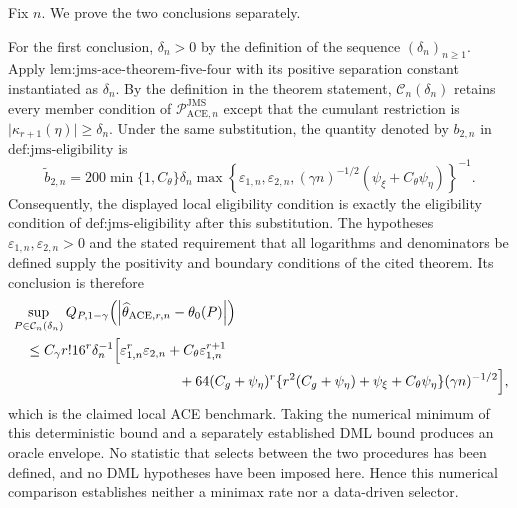 Fix \(n\).  We prove the two conclusions separately.

For the first conclusion, \(\delta_n>0\) by the definition of the sequence \((\delta_n)_{n\geq 1}\).  Apply \(\text{lem:jms-ace-theorem-five-four}\) with its positive separation constant instantiated as \(\delta_n\).  By the definition in the theorem statement, \(\mathcal C_n(\delta_n)\) retains every member condition of \(\mathcal P_{\mathrm{ACE},n}^{\mathrm{JMS}}\) except that the cumulant restriction is \(\lvert\kappa_{r+1}(\eta)\rvert\geq\delta_n\).  Under the same substitution, the quantity denoted by \(b_{2,n}\) in \(\text{def:jms-eligibility}\) is
\[
 \widetilde b_{2,n}
 =200\min\{1,C_{\theta}\}\delta_n
 \max\!\left\{
   \varepsilon_{1,n},\varepsilon_{2,n},
   (\gamma n)^{-1/2}(\psi_{\xi}+C_{\theta}\psi_{\eta})
 \right\}^{-1}.
\]
Consequently, the displayed local eligibility condition is exactly the eligibility condition of \(\text{def:jms-eligibility}\) after this substitution.  The hypotheses \(\varepsilon_{1,n},\varepsilon_{2,n}>0\) and the stated requirement that all logarithms and denominators be defined supply the positivity and boundary conditions of the cited theorem.  Its conclusion is therefore
\[
\begin{aligned}
 &\sup_{P\in\mathcal C_n(\delta_n)}
 Q_{P,1-\gamma}
 \!\left(\left|\widehat\theta_{\mathrm{ACE},r,n}-\theta_0(P)\right|\right)\\
 &\quad\leq C_{\gamma}r!16^r\delta_n^{-1}
 \Bigl[
   \varepsilon_{1,n}^r\varepsilon_{2,n}
   +C_{\theta}\varepsilon_{1,n}^{r+1}\\
 &\hspace{42mm}
   +64(C_g+\psi_{\eta})^r
    \{r^2(C_g+\psi_{\eta})+\psi_{\xi}+C_{\theta}\psi_{\eta}\}
    (\gamma n)^{-1/2}
 \Bigr],
\end{aligned}
\]
which is the claimed local ACE benchmark.  Taking the numerical minimum of this deterministic bound and a separately established DML bound produces an oracle envelope.  No statistic that selects between the two procedures has been defined, and no DML hypotheses have been imposed here.  Hence this numerical comparison establishes neither a minimax rate nor a data-driven selector.

